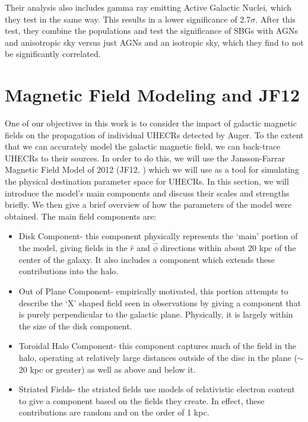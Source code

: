 Their analysis also includes gamma ray emitting Active Galactic Nuclei, which they test in the same way. This results in a lower significance of 2.7$\sigma$. After this test, they combine the populations and test the significance of SBGs with AGNs and anisotropic sky versus just AGNs and an isotropic sky, which they find to not be significantly correlated.


\section{Magnetic Field Modeling and JF12}
\label{jf12}
One of our objectives in this work is to consider the impact of galactic magnetic fields on the propagation of individual UHECRs detected by Auger. To the extent that we can accurately model the galactic magnetic field, we can back-trace UHECRs to their sources. 
In order to do this, we will use the Jansson-Farrar Magnetic Field Model of 2012 (JF12, \cite{jf12}) which we will use as a tool for simulating the physical destination parameter space for UHECRs. In this section, we will introduce the model's main components and discuss their scales and strengths briefly. We then give a brief overview of how the parameters of the model were obtained. The main field components are:
\begin{itemize}
\item Disk Component- this component physically represents the `main' portion of the model, giving fields in the $\hat{r}$ and $\hat{\phi}$ directions within about 20 kpc of the center of the galaxy. It also includes a component which extends these contributions into the halo.
\item Out of Plane Component- empirically motivated, this portion attempts to describe the `X' shaped field seen in observations by giving a component that is purely perpendicular to the galactic plane. Physically, it is largely within the size of the disk component.
\item Toroidal Halo Component- this component captures much of the field in the halo, operating at relatively large distances outside of the disc in the plane ($\sim$20 kpc or greater) as well as above and below it. 
\item Striated Fields- the striated fields use models of relativistic electron content to give a component based on the fields they create. In effect, these contributions are random and on the order of 1 kpc. 
\end{itemize}
